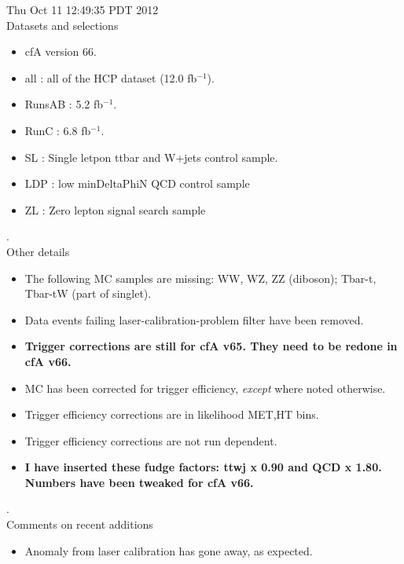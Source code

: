 \documentclass[11pt]{article}
\begin{document}
   Thu Oct 11 12:49:35 PDT 2012 \\

   Datasets and selections
   \begin{itemize}
     \item cfA version 66.
     \item all : all of the HCP dataset (12.0 fb$^{-1}$).
     \item RunsAB : 5.2 fb$^{-1}$.
     \item RunC : 6.8 fb$^{-1}$.
     \item SL : Single letpon ttbar and W+jets control sample.
     \item LDP : low minDeltaPhiN QCD control sample
     \item ZL : Zero lepton signal search sample
   \end{itemize}

.\\

   Other details
   \begin{itemize}
     \item The following MC samples are missing: WW, WZ, ZZ (diboson); Tbar-t, Tbar-tW (part of singlet).
     \item Data events failing laser-calibration-problem filter have been removed.
     \item {\bf Trigger corrections are still for cfA v65.  They need to be redone in cfA v66. }
     \item MC has been corrected for trigger efficiency, {\it except} where noted otherwise.
     \item Trigger efficiency corrections are in likelihood MET,HT bins.
     \item Trigger efficiency corrections are not run dependent.
     \item {\bf I have inserted these fudge factors: ttwj x 0.90 and QCD x 1.80.  Numbers have been tweaked for cfA v66.}
   \end{itemize}

.\\

  Comments on recent additions
  \begin{itemize}
    \item Anomaly from laser calibration has gone away, as expected.
   \end{itemize}


  \pagebreak
  \clearpage
  \tableofcontents
  \clearpage


\end{document}
